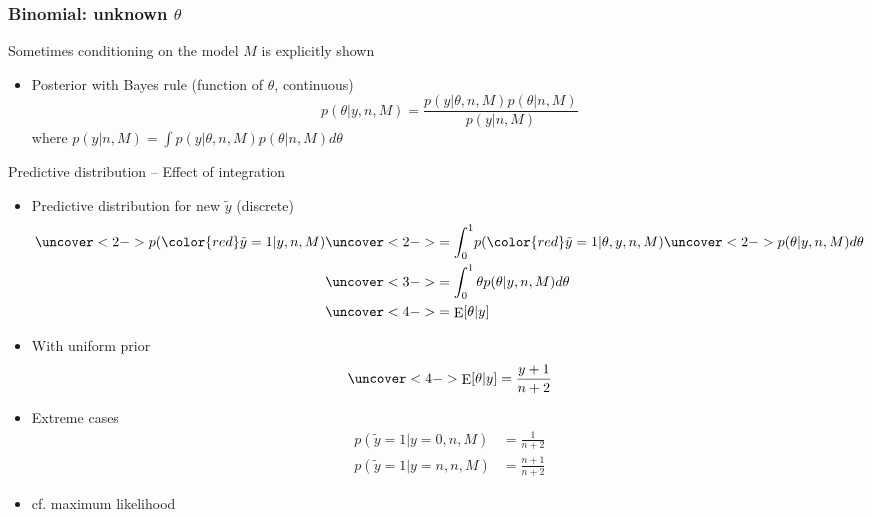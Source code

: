 \documentclass[english,t]{beamer}
\DeclareMathOperator{\E}{E}
\begin{document}
\begin{frame}
  \frametitle{Binomial: unknown $\theta$}

  Sometimes conditioning on the model $M$ is explicitly shown
  
  \begin{itemize}
  \item {\color{blue}Posterior} with Bayes rule (function of $\theta$, continuous)
    \begin{equation*}
      p(\theta|y,n,M)=\frac{p(y|\theta,n,M)p(\theta|n,M)}{p(y|n,M)}
    \end{equation*}
    where $p(y|n,M)=\int p(y|\theta,n,M)p(\theta|n,M) d\theta$
    \vspace{0.5\baselineskip}
  \end{itemize}

\end{frame}

\begin{frame}{Predictive distribution -- Effect of integration}

  \begin{itemize}
  \item Predictive distribution for new $\tilde{y}$ (discrete)
    \begin{align*}
      \uncover<2->{p({\color{red}\tilde{y}=1}|y,n,M)} & \uncover<2->{= \int_0^1} p({\color{red}\tilde{y}=1}|\theta,y,n,M) \uncover<2->{p(\theta|y,n,M)d\theta}\\
      &\uncover<3->{= \int_0^1 \theta p(\theta|y,n,M)d\theta}\\
      &\uncover<4->{= \E[\theta|y]}
    \end{align*}
    \vskip -4mm
  \item<5-> With uniform prior
    \begin{align*}
      \uncover<4->{\E[\theta|y] = \frac{y+1}{n+2}}
    \end{align*}
  \item<6-> Extreme cases
    \begin{align*}
      p(\tilde{y}=1|y=0,n,M) &= \frac{1}{n+2} \\
      p(\tilde{y}=1|y=n,n,M) &= \frac{n+1}{n+2}
    \end{align*}
    \vskip -2mm

  \item<6-> cf. maximum likelihood

  \end{itemize}
\end{frame}
\end{document}
